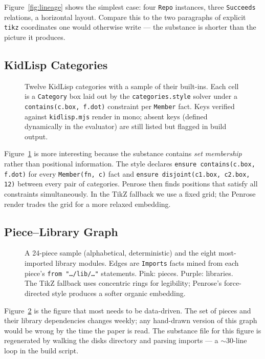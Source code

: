 \documentclass[10pt,letterpaper,twocolumn]{article}
\begin{document}
Figure~\ref{fig:lineage} shows the simplest case: four \texttt{Repo} instances, three \texttt{Succeeds} relations, a horizontal layout. Compare this to the two paragraphs of explicit \texttt{tikz} coordinates one would otherwise write --- the substance is shorter than the picture it produces.

\subsection{KidLisp Categories}

\begin{figure}[h]
\centering
\resizebox{\linewidth}{!}{}
\caption{Twelve KidLisp categories with a sample of their built-ins. Each cell is a \texttt{Category} box laid out by the \texttt{categories.style} solver under a \texttt{contains(c.box, f.dot)} constraint per \texttt{Member} fact. Keys verified against \texttt{kidlisp.mjs} render in mono; absent keys (defined dynamically in the evaluator) are still listed but flagged in build output.}
\label{fig:categories}
\end{figure}

Figure~\ref{fig:categories} is more interesting because the substance contains \emph{set membership} rather than positional information. The style declares \texttt{ensure contains(c.box, f.dot)} for every \texttt{Member(fn, c)} fact and \texttt{ensure disjoint(c1.box, c2.box, 12)} between every pair of categories. Penrose then finds positions that satisfy all constraints simultaneously. In the TikZ fallback we use a fixed grid; the Penrose render trades the grid for a more relaxed embedding.

\subsection{Piece--Library Graph}

\begin{figure}[h]
\centering
\resizebox{\linewidth}{!}{}
\caption{A 24-piece sample (alphabetical, deterministic) and the eight most-imported library modules. Edges are \texttt{Imports} facts mined from each piece's \texttt{from "\ldots/lib/\ldots"} statements. Pink: pieces. Purple: libraries. The TikZ fallback uses concentric rings for legibility; Penrose's force-directed style produces a softer organic embedding.}
\label{fig:clusters}
\end{figure}

Figure~\ref{fig:clusters} is the figure that most needs to be data-driven. The set of pieces and their library dependencies changes weekly; any hand-drawn version of this graph would be wrong by the time the paper is read. The substance file for this figure is regenerated by walking the disks directory and parsing imports --- a $\sim$30-line loop in the build script.
\end{document}
